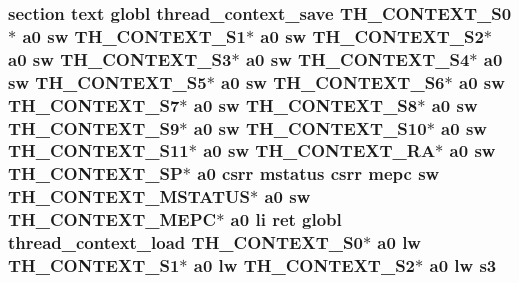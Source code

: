 \hypertarget{riscv_2threada_8S_a69162c7b8d6f05df98838fb0abd62115}{
\subsubsection[{s3}]{\setlength{\rightskip}{0pt plus 5cm}section text globl {\bf thread\-\_\-context\-\_\-save} {\bf T\-H\-\_\-\-C\-O\-N\-T\-E\-X\-T\-\_\-\-S0}$\ast$ {\bf a0} {\bf sw} {\bf T\-H\-\_\-\-C\-O\-N\-T\-E\-X\-T\-\_\-\-S1}$\ast$ {\bf a0} {\bf sw} {\bf T\-H\-\_\-\-C\-O\-N\-T\-E\-X\-T\-\_\-\-S2}$\ast$ {\bf a0} {\bf sw} {\bf T\-H\-\_\-\-C\-O\-N\-T\-E\-X\-T\-\_\-\-S3}$\ast$ {\bf a0} {\bf sw} {\bf T\-H\-\_\-\-C\-O\-N\-T\-E\-X\-T\-\_\-\-S4}$\ast$ {\bf a0} {\bf sw} {\bf T\-H\-\_\-\-C\-O\-N\-T\-E\-X\-T\-\_\-\-S5}$\ast$ {\bf a0} {\bf sw} {\bf T\-H\-\_\-\-C\-O\-N\-T\-E\-X\-T\-\_\-\-S6}$\ast$ {\bf a0} {\bf sw} {\bf T\-H\-\_\-\-C\-O\-N\-T\-E\-X\-T\-\_\-\-S7}$\ast$ {\bf a0} {\bf sw} {\bf T\-H\-\_\-\-C\-O\-N\-T\-E\-X\-T\-\_\-\-S8}$\ast$ {\bf a0} {\bf sw} {\bf T\-H\-\_\-\-C\-O\-N\-T\-E\-X\-T\-\_\-\-S9}$\ast$ {\bf a0} {\bf sw} {\bf T\-H\-\_\-\-C\-O\-N\-T\-E\-X\-T\-\_\-\-S10}$\ast$ {\bf a0} {\bf sw} {\bf T\-H\-\_\-\-C\-O\-N\-T\-E\-X\-T\-\_\-\-S11}$\ast$ {\bf a0} {\bf sw} {\bf T\-H\-\_\-\-C\-O\-N\-T\-E\-X\-T\-\_\-\-R\-A}$\ast$ {\bf a0} {\bf sw} {\bf T\-H\-\_\-\-C\-O\-N\-T\-E\-X\-T\-\_\-\-S\-P}$\ast$ {\bf a0} csrr {\bf mstatus} csrr {\bf mepc} {\bf sw} {\bf T\-H\-\_\-\-C\-O\-N\-T\-E\-X\-T\-\_\-\-M\-S\-T\-A\-T\-U\-S}$\ast$ {\bf a0} {\bf sw} {\bf T\-H\-\_\-\-C\-O\-N\-T\-E\-X\-T\-\_\-\-M\-E\-P\-C}$\ast$ {\bf a0} {\bf li} ret globl {\bf thread\-\_\-context\-\_\-load} {\bf T\-H\-\_\-\-C\-O\-N\-T\-E\-X\-T\-\_\-\-S0}$\ast$ {\bf a0} {\bf lw} {\bf T\-H\-\_\-\-C\-O\-N\-T\-E\-X\-T\-\_\-\-S1}$\ast$ {\bf a0} {\bf lw} {\bf T\-H\-\_\-\-C\-O\-N\-T\-E\-X\-T\-\_\-\-S2}$\ast$ {\bf a0} {\bf lw} s3}}\label{riscv_2threada_8S_a69162c7b8d6f05df98838fb0abd62115}

